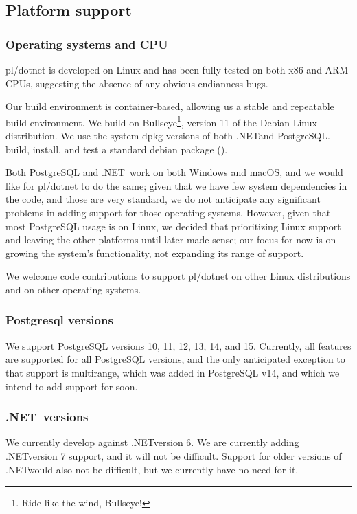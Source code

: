 \documentclass[sigconf,techreport,authorversion,nonacm]{acmart}
\newcommand{\dotnet}{.NET}
\begin{document}
\subsection{Platform support}

\subsubsection{Operating systems and CPU}

pl/dotnet is developed on Linux and has been fully tested on both
x86 and ARM CPUs, suggesting the absence of any obvious endianness
bugs.

Our build environment is container-based, allowing us a stable and
repeatable build environment. We build on Bullseye\footnote{Ride
like the wind, Bullseye!}, version 11 of the Debian Linux distribution.
We use the system dpkg versions of both \dotnet and PostgreSQL.\@We
build, install, and test a standard debian package ().

Both PostgreSQL and \dotnet\ work on both Windows and macOS, and we
would like for pl/dotnet to do the same; given that we have few
system dependencies in the code, and those are very standard, we
do not anticipate any significant problems in adding support for
those operating systems. However, given that most PostgreSQL usage
is on Linux, we decided that prioritizing Linux support and leaving
the other platforms until later made sense; our focus for now is
on growing the system's functionality, not expanding its range of
support.

We welcome code contributions to support pl/dotnet on other
Linux distributions and on other operating systems.

\subsubsection{Postgresql versions}

We support PostgreSQL versions 10, 11, 12, 13, 14, and 15.
Currently, all features are supported for all PostgreSQL
versions, and the only anticipated exception to that support
is multirange, which was added in PostgreSQL v14, and which
we intend to add support for soon.

\subsubsection{\dotnet\ versions}

We currently develop against \dotnet version 6. We are currently
adding \dotnet version 7 support, and it will not be difficult.
Support for older versions of \dotnet would also not be difficult,
but we currently have no need for it.
\end{document}
